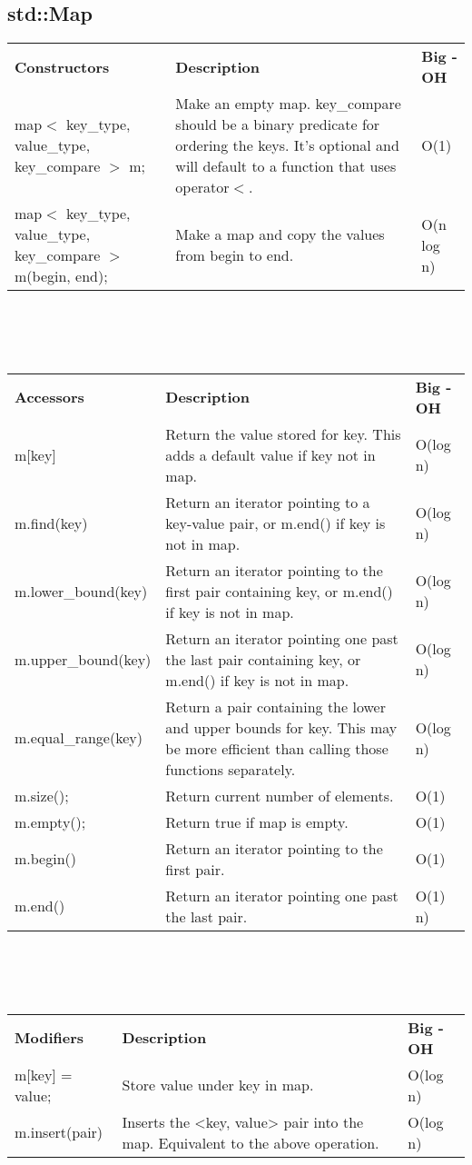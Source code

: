 \documentclass[12pt]{article}
\begin{document}
\subsection{std::Map}
\begin{tabular}{ p{5cm} p{7cm}  p{5cm} }
\textbf{Constructors} & \textbf{Description} & \textbf{Big - OH}\\
map$<$ key\_type, value\_type, key\_compare $>$ m; & Make an empty map. key\_compare should be a binary predicate for ordering the keys. It's optional and will default to a function that uses operator$<$. & O(1)\\
map$<$ key\_type, value\_type, key\_compare $>$ m(begin, end); & Make a map and copy the values from begin to end. & O(n log n)
\end{tabular}
\\
\\
\\
\begin{tabular}{ p{5cm} p{7cm}  p{5cm} }
\textbf{Accessors} & \textbf{Description} & \textbf{Big - OH}\\
m[key] & Return the value stored for key. This adds a default value if key not in map. & O(log n)\\
m.find(key) & Return an iterator pointing to a key-value pair, or m.end() if key is not in map. & O(log n)\\
m.lower\_bound(key) & Return an iterator pointing to the first pair containing key, or m.end() if key is not in map. & O(log n)\\
m.upper\_bound(key) & Return an iterator pointing one past the last pair containing key, or m.end() if key is not in map. & O(log n)\\
m.equal\_range(key) & Return a pair containing the lower and upper bounds for key. This may be more efficient than calling those functions separately. & O(log n)\\
m.size(); & Return current number of elements. & O(1)\\
m.empty(); & Return true if map is empty. & O(1)\\
m.begin() & Return an iterator pointing to the first pair. & O(1)\\
m.end() & Return an iterator pointing one past the last pair. & O(1) n)
\end{tabular}
\\
\\
\\
\begin{tabular}{ p{5cm} p{7cm}  p{5cm} }
\textbf{Modifiers} & \textbf{Description} & \textbf{Big - OH}\\
m[key] = value; & Store value under key in map. & O(log n)\\
m.insert(pair) & Inserts the <key, value> pair into the map. Equivalent to the above operation. & O(log n)
\end{tabular}
\end{document}
